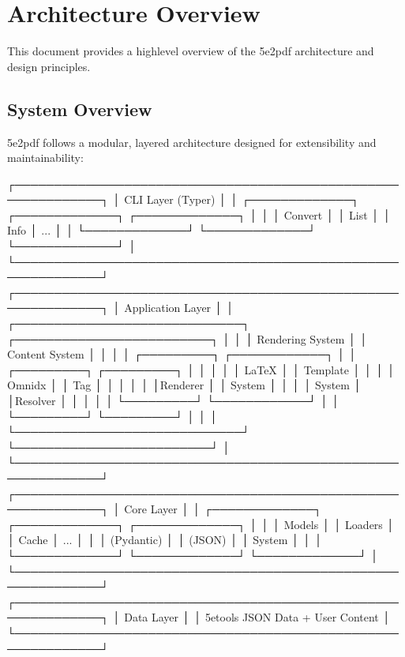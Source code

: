 \documentclass[letterpaper,10pt,english]{sphinxmanual}
\begin{document}
\begin{fulllineitems}
\begin{fulllineitems}
\end{fulllineitems}


\end{fulllineitems}


\sphinxstepscope


\section{Architecture Overview}
\label{\detokenize{developer/architecture:architecture-overview}}\label{\detokenize{developer/architecture::doc}}
\sphinxAtStartPar
This document provides a high\sphinxhyphen{}level overview of the 5e2pdf architecture and design principles.


\subsection{System Overview}
\label{\detokenize{developer/architecture:system-overview}}
\sphinxAtStartPar
5e2pdf follows a modular, layered architecture designed for extensibility and maintainability:

\begin{sphinxVerbatim}[commandchars=\\\{\}]
┌─────────────────────────────────────────────────────────────┐
│                    CLI Layer (Typer)                       │
│  ┌─────────────┐ ┌─────────────┐ ┌─────────────┐           │
│  │   Convert   │ │    List     │ │    Info     │  ...      │
│  └─────────────┘ └─────────────┘ └─────────────┘           │
└─────────────────────────────────────────────────────────────┘
┌─────────────────────────────────────────────────────────────┐
│                  Application Layer                          │
│  ┌─────────────────────────────┐ ┌─────────────────────────┐ │
│  │     Rendering System        │ │    Content System       │ │
│  │  ┌─────────┐ ┌────────────┐ │ │ ┌─────────┐ ┌─────────┐ │ │
│  │  │ LaTeX   │ │  Template  │ │ │ │ Omnidx  │ │   Tag   │ │ │
│  │  │Renderer │ │  System    │ │ │ │ System  │ │Resolver │ │ │
│  │  └─────────┘ └────────────┘ │ │ └─────────┘ └─────────┘ │ │
│  └─────────────────────────────┘ └─────────────────────────┘ │
└─────────────────────────────────────────────────────────────┘
┌─────────────────────────────────────────────────────────────┐
│                     Core Layer                              │
│  ┌─────────────┐ ┌─────────────┐ ┌─────────────┐           │
│  │    Models   │ │   Loaders   │ │    Cache    │  ...      │
│  │ (Pydantic)  │ │    (JSON)   │ │   System    │           │
│  └─────────────┘ └─────────────┘ └─────────────┘           │
└─────────────────────────────────────────────────────────────┘
┌─────────────────────────────────────────────────────────────┐
│                     Data Layer                              │
│           5etools JSON Data + User Content                  │
└─────────────────────────────────────────────────────────────┘
\end{sphinxVerbatim}
\end{document}

